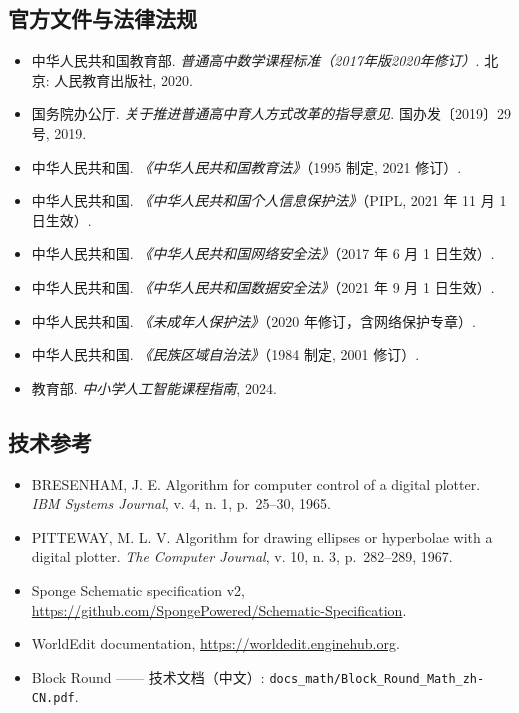 \documentclass[12pt,a4paper]{scrartcl}
\begin{document}
\subsection{官方文件与法律法规}
\begin{itemize}[leftmargin=1.3em,itemsep=0.15em,topsep=0.3em]
  \item 中华人民共和国教育部. \emph{普通高中数学课程标准（2017年版2020年修订）}. 北京: 人民教育出版社, 2020.
  \item 国务院办公厅. \emph{关于推进普通高中育人方式改革的指导意见}. 国办发〔2019〕29号, 2019.
  \item 中华人民共和国. \emph{《中华人民共和国教育法》}（1995 制定, 2021 修订）.
  \item 中华人民共和国. \emph{《中华人民共和国个人信息保护法》}（PIPL, 2021 年 11 月 1 日生效）.
  \item 中华人民共和国. \emph{《中华人民共和国网络安全法》}（2017 年 6 月 1 日生效）.
  \item 中华人民共和国. \emph{《中华人民共和国数据安全法》}（2021 年 9 月 1 日生效）.
  \item 中华人民共和国. \emph{《未成年人保护法》}（2020 年修订，含网络保护专章）.
  \item 中华人民共和国. \emph{《民族区域自治法》}（1984 制定, 2001 修订）.
  \item 教育部. \emph{中小学人工智能课程指南}, 2024.
\end{itemize}

\subsection{技术参考}
\begin{itemize}[leftmargin=1.3em,itemsep=0.15em,topsep=0.3em]
  \item BRESENHAM, J. E. Algorithm for computer control of a digital plotter. \emph{IBM Systems Journal}, v. 4, n. 1, p.~25--30, 1965.
  \item PITTEWAY, M. L. V. Algorithm for drawing ellipses or hyperbolae with a digital plotter. \emph{The Computer Journal}, v. 10, n. 3, p.~282--289, 1967.
  \item Sponge Schematic specification v2, \url{https://github.com/SpongePowered/Schematic-Specification}.
  \item WorldEdit documentation, \url{https://worldedit.enginehub.org}.
  \item Block Round —— 技术文档（中文）: \texttt{docs\_math/Block\_Round\_Math\_zh-CN.pdf}.
\end{itemize}
\end{document}
